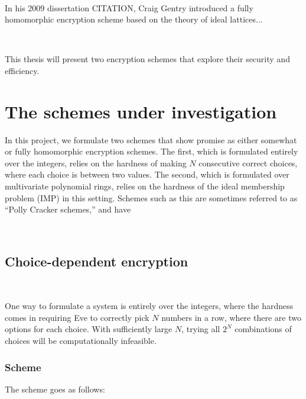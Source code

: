 \documentclass[11pt]{report}
\begin{document}
\

In his 2009 dissertation CITATION, Craig Gentry introduced a fully homomorphic encryption scheme based on the theory of ideal lattices...

\

This thesis will present two encryption schemes that explore their security and efficiency.

\section[Schemes]{The schemes under investigation}

In this project, we formulate two schemes that show promise as either somewhat or fully homomorphic encryption schemes. The first,
which is formulated entirely over the integers, relies on the hardness of making $N$ consecutive correct choices, where each choice
is between two values.
The second, which is formulated over multivariate polynomial rings, relies on the hardness of the ideal membership problem (IMP) in this
setting. Schemes such as this are sometimes referred to as ``Polly Cracker schemes,'' and have 

\

\subsection{Choice-dependent encryption}

\

One way to formulate a system is entirely over the integers, where the hardness comes in requiring Eve to correctly pick $N$ numbers in a row, where there are two options for each choice. With sufficiently large $N$, trying all $2^N$ combinations of choices will be computationally infeasible.

\subsubsection{Scheme}

The scheme goes as follows:
\end{document}
